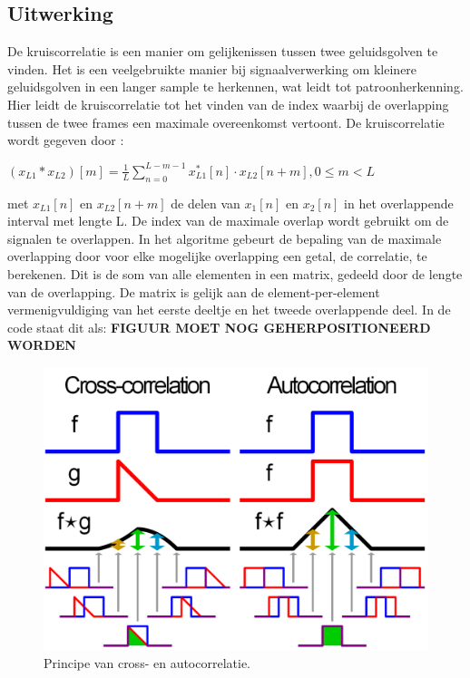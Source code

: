 \documentclass[12pt]{report}
\begin{document}
\subsection{Uitwerking}
De kruiscorrelatie is een manier om gelijkenissen tussen twee geluidsgolven te vinden. Het is een veelgebruikte manier bij signaalverwerking om kleinere geluidsgolven in een langer sample te herkennen, wat leidt tot patroonherkenning. Hier leidt de kruiscorrelatie tot het vinden van de index waarbij de overlapping tussen de twee frames een maximale overeenkomst vertoont.
De kruiscorrelatie wordt gegeven door :
\begin{center}
$(x_{L1}*x_{L2})[m]=\frac{1}{L} \sum\limits_{n=0}^{L-m-1}  x_{L1}^{*}[n]\cdot x_{L2}[n+m], 0 \le m < L $
\end{center}
met $x_{L1}[n]$ en $x_{L2}[n+m]$ de delen van $x_{1}[n]$ en $x_{2}[n]$ in het overlappende interval met lengte L. De index van de maximale overlap wordt gebruikt om de signalen te overlappen.
In het algoritme gebeurt de bepaling van de maximale overlapping door voor elke mogelijke overlapping een getal, de correlatie, te berekenen. Dit is de som van alle elementen in een matrix, gedeeld door de lengte van de overlapping. De matrix is gelijk aan de element-per-element vermenigvuldiging van het eerste deeltje en het tweede overlappende deel. In de code staat dit als:
\textbf{FIGUUR MOET NOG GEHERPOSITIONEERD WORDEN}
\begin{figure}
\centering
\includegraphics[width=\textwidth]{crossautocorrelatie}
\caption{Principe van cross- en autocorrelatie.}
\label{fig:crosscorrelatie}
\end{figure}
\end{document}
